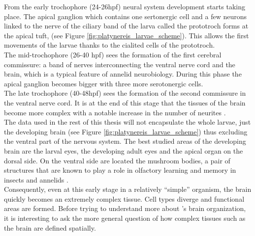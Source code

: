      From the early trochophore (24-26hpf) neural system development starts taking place. The apical ganglion which contains one sertonergic cell and a few neurons linked to the nerve of the ciliary band of the larva called the prototroch forms at the apical tuft, (see Figure \ref{fig:platynereis_larvae_scheme}). This allows the first movements of the larvae thanks to the cialited cells of the prototroch.\\
     
     The mid-trochophore (26-40 hpf) sees the formation of the first cerebral commissure: a band of nerves interconnecting the ventral nerve cord and the brain, which is a typical feature of annelid neurobiology. During this phase the apical ganglion becomes bigger with three more serotonergic cells.\\
     
     The late trochophore (40-48hpf) sees the formation of the second commissure in the ventral nerve cord. It is at the end of this stage that the tissues of the brain become more complex with a notable increase in the number of neurites \cite{Fischer10}.\\
     
     The data used in the rest of this thesis will not encapsulate the whole larvae, just the developing brain (see Figure \ref{fig:platynereis_larvae_scheme}) thus excluding the ventral part of the nervous system. The best studied areas of the developing brain are the larval eyes, the developing adult eyes and the apical organ on the dorsal side. On the ventral side are located the mushroom bodies, a pair of structures that are known to play a role in olfactory learning and memory in insects and annelids \cite{Tomer10}.\\
     
     Consequently, even at this early stage in a relatively ``simple'' organism, the brain quickly becomes an extremely complex tissue. Cell types diverge and functional areas are formed. Before trying to understand more about \platy{}'s brain organization, it is interesting to ask the more general question of how complex tissues such as the brain are defined spatially.
     
